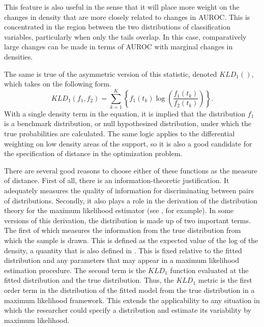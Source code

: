 This feature is also useful in the sense that it will place more weight on the changes in density that are more closely related to changes in AUROC.
This is concentrated in the region between the two distributions of classification variables, particularly when only the tails overlap.
In this case, comparatively large changes can be made in terms of AUROC with marginal changes in densities.

The same is true of the asymmetric version of this statistic, denoted $KLD_1()$, which takes on the following form. 
% 
\begin{equation}
    KLD_1(f_1, f_2) = \sum_{k = 1}^{K} \left\{ f_1(t_k)
        \log \left( \frac{f_1(t_k)}{f_2(t_k)} \right) \right\}.
\end{equation}
% 
With a single density term in the equation, it is implied that the distribution $f_1$ is a benchmark distribution, or null hypothesized distribution, under which the true probabilities are calculated. 
The same logic applies to the differential weighting on low density areas of the support, so it is also a good candidate for the specification of distance in the optimization problem.

There are several good reasons to choose either of these functions as the measure of distance.
%
First of all, there is an information-theoretic justification.
It adequately measures the quality of information for discriminating between pairs of distributions.
Secondly, it also plays a role in the derivation of the distribution theory for the maximum likelihood estimator (see \citet{amemiya1985}, for example).
In some versions of this derivation, the distribution is made up of two important terms.
The first of which measures the information from the true distribution from which the sample is drawn.
This is defined as the expected value of the log of the density, a quantity that is also defined in \citet{kullbackliebler1951}.
This is fixed relative to the fitted distribution and any parameters that may appear in a maximum likelihood estimation procedure.
The second term is the $KLD_1$ function evaluated at the fitted distribution and the true distribution.
Thus, the $KLD_1$ metric is the first order term in the distribution of the fitted model from the true distribution in a maximum likelihood framework.
%
This extends the applicability to any situation in which the researcher could specify a distribution and estimate its variability by maximum likelihood.

